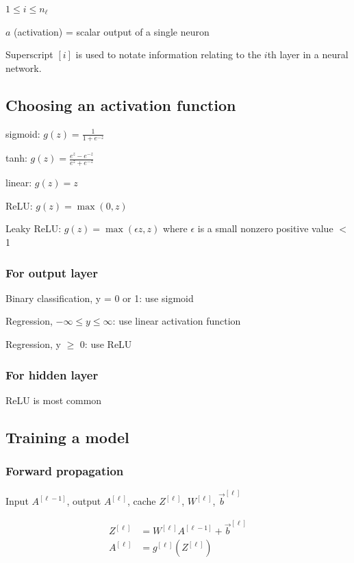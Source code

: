\documentclass[12pt]{article}
\begin{document}
$1 \leq i \leq n_{\ell}$

$a$ (activation) = scalar output of a single neuron

Superscript $[i]$ is used to notate information relating to the $i$th layer in a neural network.

\subsection{Choosing an activation function}

sigmoid: $g(z) = \frac{1}{1 + e^{-z}}$

tanh: $g(z) = \frac{e^z - e^{-z}}{e^z + e^{-z}}$

linear: $g(z) = z$

ReLU: $g(z) = \max(0, z)$

Leaky ReLU: $g(z) = \max(\epsilon z, z)$ where $\epsilon$ is a small nonzero positive value $<$ 1

\subsubsection*{For output layer}

Binary classification, y = 0 or 1: use sigmoid

Regression, $-\infty \leq y \leq \infty$: use linear activation function

Regression, y $\geq$ 0: use ReLU

\subsubsection*{For hidden layer}

ReLU is most common

\subsection{Training a model}
\subsubsection{Forward propagation}

Input $A^{[\ell-1]}$, output $A^{[\ell]}$, cache $Z^{[\ell]}$, $W^{[\ell]}$, $\vec{b}^{[\ell]}$

\begin{align*}
    Z^{[\ell]} &= W^{[\ell]} A^{[\ell-1]} + \vec{b}^{[\ell]}\\
    A^{[\ell]} &= g^{[\ell]}(Z^{[\ell]})
\end{align*}
\end{document}
